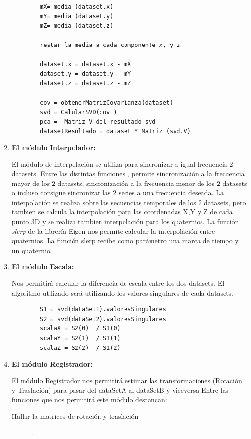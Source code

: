 \begin{enumerate}
	\begin{lstlisting}
		
		mX= media (dataset.x)
		mY= media (dataset.y)
		mZ= media (dataset.z)

		restar la media a cada componente x, y z

		dataset.x = dataset.x - mX
		dataset.y = dataset.y - mY
		dataset.z = dataset.z - mZ

		cov = obtenerMatrizCovarianza(dataset)
		svd = CalularSVD(cov )
		pca =  Matriz V del resultado svd
		datasetResultado = dataset * Matriz (svd.V)

	\end{lstlisting}
	    

		


\item \textbf{El módulo Interpolador:}

	El módulo de interpolación se utiliza para sincronizar a igual frecuencia 2 datasets.
	Entre las distintas funciones , permite sincronización a la frecuencia mayor de los 2 datasets, sincronización a la frecuencia menor de los 2 datasets o incluso consigue sincronizar las 2 series a una frecuencia deseada. La interpolación se realiza sobre las secuencias temporales de los 2 datasets, pero tambien se calcula la interpolación para las coordenadas X,Y y Z de cada punto 3D y se realiza tambien interpolación para los quaternios. La función \textit{slerp} de la librería Eigen nos permite calcular la interpolación entre quaternios. La función slerp recibe como parámetro una marca de tiempo y un quaternio.

\item \textbf{El módulo Escala:}

Nos permitirá calcular la diferencia de escala entre los dos datasets.
El algoritmo utilizado será utilizando los valores singulares de cada datasets.
        
	\begin{lstlisting}
		S1 = svd(dataSet1).valoresSingulares
		S2 = svd(dataSet2).valoresSingulares
		scalaX = S2(0)  / S1(0)
		scalaY = S2(1)  / S1(1)
		scalaZ = S2(2)  / S1(2)
	\end{lstlisting}
		



\item \textbf{El módulo Registrador:}

El módulo Registrador nos permitirá estimar las transformaciones (Rotación y Traslación) para pasar del dataSetA al dataSetB y viceversa
Entre las funciones que nos permitirá este módulo destancan:
    \begin{description}
	\item [Hallar la matrices de rotación y traslación] .


\end{description}
\end{enumerate}
